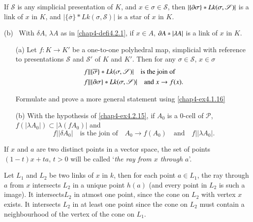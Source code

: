 \begin{ex}\label{chap4-ex4.3.12}
If $\mathscr{S}$ is any simplicial presentation of $K$, and $x\in \sigma\in\mathscr{S}$, then $|\{\partial \sigma\}\ast Lk(\sigma,\mathscr{S})|$ is a link of $x$ in $K$, and $|\{\overline{\sigma}\}\ast Lk(\sigma,\mathscr{S})|$ is a star of $x$ in $K$.

(b)~ With $\delta A$, $\lambda A$ as in \ref{chap4-defi4.2.1}, if $x\in A$, $\partial A\ast |\lambda A|$ is a link of $x$ in $K$. 
\end{ex}

\setcounter{proposition}{11}
\begin{dashex}\label{chap4-dashex4.3.12'}
\begin{itemize}
\item[(a)] Let $f:K\to K'$ be a one-to-one polyhedral map, simplicial with reference to presentations $\mathscr{S}$ and $\mathscr{S}'$ of $K$ and $K'$. Then for any $\sigma\in \mathscr{S}$, $x\in \sigma$
\begin{align*}
& f||\{\overline{\sigma}\}\ast Lk(\sigma,\mathscr{S})|\quad \text{is the join of}\\
& f||\{\partial \sigma\}\ast Lk(\sigma,\mathscr{S})|\quad\text{and~ } x\to f(x).
\end{align*}

Formulate and prove a more general statement using \ref{chap4-ex4.1.16}

\item[(b)] With the hypothesis of \ref{chap4-ex4.2.15}, if $A_{0}$ is a $0$-cell of $\mathscr{P}$, $f(|\lambda A_{0}|)\subset |\lambda (fA_{0})|$ and
$$
f||\delta A_{0}|\quad\text{is the join of}\quad A_{0}\to f(A_{0})\quad\text{and}\quad f||\lambda A_{0}|.
$$
\end{itemize}
\end{dashex}

If $x$ and $a$ are two distinct points in a vector space, the set of points $(1-t)x+ta$, $t>0$  will be called `{\em the ray from $x$ through $a$}'.

Let $L_{1}$ and $L_{2}$ be two links of $x$ in $k$, then for each point $a\in L_{1}$, the ray through $a$ from $x$ intersects $L_{2}$ in a unique point $h(a)$ (and every point in $L_{2}$ is such a image). It intersects\pageoriginale $L_{2}$ in atmost one point, since the cone on $L_{2}$ with vertex $x$ exists. It intersects $L_{2}$ in at least one point since the cone on $L_{2}$ must contain a neighbourhood of the vertex of the cone on $L_{1}$.

